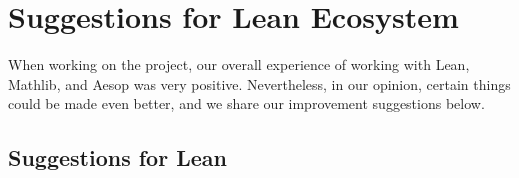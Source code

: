 \section{Suggestions for Lean Ecosystem}

When working on the project, our overall experience of working with Lean, Mathlib, and Aesop was very positive. Nevertheless, in our opinion, certain things could be made even better, and we share our improvement suggestions below.

\subsection{Suggestions for Lean}


